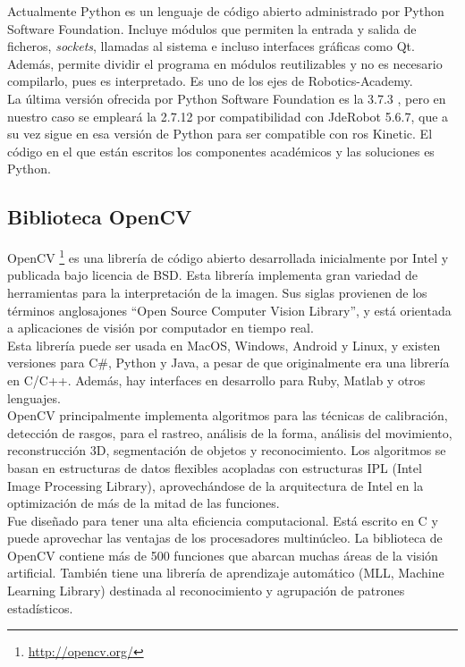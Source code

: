 Actualmente Python es un lenguaje de código abierto administrado por Python Software Foundation. Incluye módulos que permiten la entrada y salida de ficheros, \textit{sockets}, llamadas al sistema e incluso interfaces gráficas como Qt. Además, permite dividir el programa en módulos reutilizables y no es necesario compilarlo, pues es interpretado. Es uno de los ejes de Robotics-Academy.\\

La última versión ofrecida por Python Software Foundation es la 3.7.3 , pero en nuestro caso se empleará la 2.7.12 por compatibilidad con JdeRobot 5.6.7, que a su vez sigue en esa versión de Python para ser compatible con \acrshort{ros} Kinetic. El código en el que están escritos los componentes académicos y las soluciones es Python.


\subsection{Biblioteca OpenCV}

OpenCV \footnote{\url{http://opencv.org/}} es una librería de código abierto desarrollada inicialmente por Intel y publicada bajo licencia de BSD. Esta librería implementa gran variedad de herramientas para la interpretación de la imagen. Sus siglas provienen de los términos anglosajones ``Open Source Computer Vision Library'', y está orientada a aplicaciones de visión por computador en tiempo real. \\

Esta librería puede ser usada en MacOS, Windows, Android y Linux, y existen versiones para C\#, Python y Java, a pesar de que originalmente era una librería en C/C++. Además, hay interfaces en desarrollo para Ruby, Matlab y otros lenguajes.\\

OpenCV principalmente implementa algoritmos para las técnicas de calibración, detección de rasgos, para el rastreo, análisis de la forma, análisis del movimiento, reconstrucción 3D, segmentación de objetos y reconocimiento. Los algoritmos se basan en estructuras de datos flexibles acopladas con estructuras IPL (Intel Image Processing Library), aprovechándose de la arquitectura de Intel en la optimización de más de la mitad de las funciones. \\

Fue diseñado para tener una alta eficiencia computacional. Está escrito en C y puede aprovechar las ventajas de los procesadores multinúcleo. La biblioteca de OpenCV contiene más de 500 funciones que abarcan muchas áreas de la visión artificial. También tiene una librería de aprendizaje automático (MLL, Machine Learning Library) destinada al reconocimiento y agrupación de patrones estadísticos.\\

